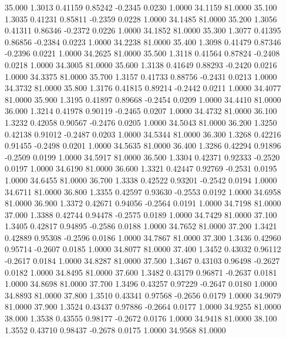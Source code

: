  35.000   1.3013   0.41159   0.85242  -0.2345   0.0230   1.0000  34.1159  81.0000
  35.100   1.3035   0.41231   0.85811  -0.2359   0.0228   1.0000  34.1485  81.0000
  35.200   1.3056   0.41311   0.86346  -0.2372   0.0226   1.0000  34.1852  81.0000
  35.300   1.3077   0.41395   0.86856  -0.2384   0.0223   1.0000  34.2238  81.0000
  35.400   1.3098   0.41479   0.87346  -0.2396   0.0221   1.0000  34.2625  81.0000
  35.500   1.3118   0.41564   0.87824  -0.2408   0.0218   1.0000  34.3005  81.0000
  35.600   1.3138   0.41649   0.88293  -0.2420   0.0216   1.0000  34.3375  81.0000
  35.700   1.3157   0.41733   0.88756  -0.2431   0.0213   1.0000  34.3732  81.0000
  35.800   1.3176   0.41815   0.89214  -0.2442   0.0211   1.0000  34.4077  81.0000
  35.900   1.3195   0.41897   0.89668  -0.2454   0.0209   1.0000  34.4410  81.0000
  36.000   1.3214   0.41978   0.90119  -0.2465   0.0207   1.0000  34.4732  81.0000
  36.100   1.3232   0.42058   0.90567  -0.2476   0.0205   1.0000  34.5043  81.0000
  36.200   1.3250   0.42138   0.91012  -0.2487   0.0203   1.0000  34.5344  81.0000
  36.300   1.3268   0.42216   0.91455  -0.2498   0.0201   1.0000  34.5635  81.0000
  36.400   1.3286   0.42294   0.91896  -0.2509   0.0199   1.0000  34.5917  81.0000
  36.500   1.3304   0.42371   0.92333  -0.2520   0.0197   1.0000  34.6190  81.0000
  36.600   1.3321   0.42447   0.92769  -0.2531   0.0195   1.0000  34.6455  81.0000
  36.700   1.3338   0.42522   0.93201  -0.2542   0.0194   1.0000  34.6711  81.0000
  36.800   1.3355   0.42597   0.93630  -0.2553   0.0192   1.0000  34.6958  81.0000
  36.900   1.3372   0.42671   0.94056  -0.2564   0.0191   1.0000  34.7198  81.0000
  37.000   1.3388   0.42744   0.94478  -0.2575   0.0189   1.0000  34.7429  81.0000
  37.100   1.3405   0.42817   0.94895  -0.2586   0.0188   1.0000  34.7652  81.0000
  37.200   1.3421   0.42889   0.95308  -0.2596   0.0186   1.0000  34.7867  81.0000
  37.300   1.3436   0.42960   0.95714  -0.2607   0.0185   1.0000  34.8077  81.0000
  37.400   1.3452   0.43032   0.96112  -0.2617   0.0184   1.0000  34.8287  81.0000
  37.500   1.3467   0.43103   0.96498  -0.2627   0.0182   1.0000  34.8495  81.0000
  37.600   1.3482   0.43179   0.96871  -0.2637   0.0181   1.0000  34.8698  81.0000
  37.700   1.3496   0.43257   0.97229  -0.2647   0.0180   1.0000  34.8893  81.0000
  37.800   1.3510   0.43341   0.97568  -0.2656   0.0179   1.0000  34.9079  81.0000
  37.900   1.3524   0.43437   0.97886  -0.2664   0.0177   1.0000  34.9255  81.0000
  38.000   1.3538   0.43555   0.98177  -0.2672   0.0176   1.0000  34.9418  81.0000
  38.100   1.3552   0.43710   0.98437  -0.2678   0.0175   1.0000  34.9568  81.0000
